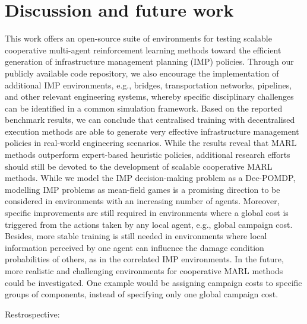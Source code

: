 \section{Discussion and future work}\label{sec:ch5_discusconclu}
This work offers an open-source suite of environments for testing scalable cooperative multi-agent reinforcement learning methods toward the efficient generation of infrastructure management planning (IMP) policies.
Through our publicly available code repository, we also encourage the implementation of additional IMP environments, e.g., bridges, transportation networks, pipelines, and other relevant engineering systems, whereby specific disciplinary challenges can be identified in a common simulation framework.
Based on the reported benchmark results, we can conclude that centralised training with decentralised execution methods are able to generate very effective infrastructure management policies in real-world engineering scenarios.
While the results reveal that MARL methods outperform expert-based heuristic policies, additional research efforts should still be devoted to the development of scalable cooperative MARL methods.
While we model the IMP decision-making problem as a Dec-POMDP, modelling IMP problems as mean-field games \citep{lauriere2022learning} is a promising direction to be considered in environments with an increasing number of agents.
Moreover, specific improvements are still required in environments where a global cost is triggered from the actions taken by any local agent, e.g., global campaign cost.
Besides, more stable training is still needed in environments where local information perceived by one agent can influence the damage condition probabilities of others, as in the correlated IMP environments.
In the future, more realistic and challenging environments for cooperative MARL methods could be investigated.
One example would be assigning campaign costs to specific groups of components, instead of specifying only one global campaign cost.

Restrospective: